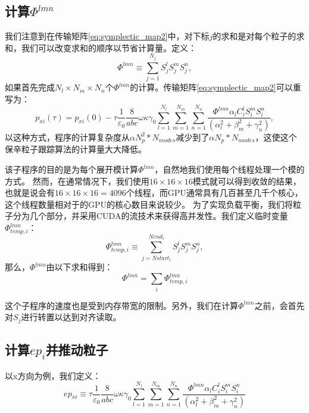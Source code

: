 \subsection{计算$\Phi^{lmn}$}\label{section:phi}
我们注意到在传输矩阵\ref{eq:symplectic_map2}中，对下标$j$的求和是对每个粒子的求和，我们可以改变求和的顺序以节省计算量。定义：
\begin{equation}
\Phi^{lmn}\equiv \sum\limits_{j=1}^{{{N}_{j}}}{S_{j}^{l}S_{j}^{m}S_{j}^{n}},
\end{equation}
如果首先完成${{N}_{l}}\times{{N}_{m}}\times{{N}_{n}}$个$\Phi^{lmn}$的计算。传输矩阵\ref{eq:symplectic_map2}可以重写为：
\begin{equation}\label{eq:symplectic_map3}
{{p}_{xi}}(\tau )={{p}_{xi}}(0)-\tau \frac{1}{{{\varepsilon }_{0}}}\frac{8}{abc}\omega \kappa {{\gamma }_{0}}\sum\limits_{l=1}^{{{N}_{l}}}{\sum\limits_{m=1}^{{{N}_{m}}}{\sum\limits_{n=1}^{{{N}_{n}}}{\frac{\Phi^{lmn}{{\alpha }_{l}}C_{i}^{l}S_{i}^{m}S_{i}^{n}}{(\alpha _{l}^{2}+\beta _{m}^{2}+\gamma _{n}^{2})}}}},
\end{equation}
以这种方式，程序的计算复杂度从$\alpha N_p^2*N_{modes}$减少到了$\alpha  N_p*N_{modes}$，这使这个保辛粒子跟踪算法的计算量大大降低。

该子程序的目的是为每个展开模计算$\Phi^{lmn}$，自然地我们使用每个线程处理一个模的方式。
然而，在通常情况下，我们使用$16\times 16\times 16$模式就可以得到收敛的结果，也就是说会有$16\times 16\times 16 = 4096$个线程，而GPU通常具有几百甚至几千个核心，这个线程数量相对于的GPU的核心数目来说较少。
为了实现负载平衡，我们将粒子分为几个部分，并采用CUDA的流技术来获得高并发性。我们定义临时变量$\Phi^{lmn}_{temp,i}$：
\begin{equation}
\Phi^{lmn}_{temp,i}\equiv \sum\limits_{j=Nstar{{t}_{i}}}^{Nen{{d}_{i}}}{S_{j}^{l}S_{j}^{m}S_{j}^{n}},
\end{equation}
那么，$\Phi^{lmn}$由以下求和得到：
\begin{equation}
\Phi^{lmn}=\sum\limits_{i}{\Phi^{lmn}_{temp,i}}
\end{equation}

这个子程序的速度也是受到内存带宽的限制。另外，我们在计算$\Phi^{lmn}$之前，会首先对$S_{j}$进行转置以达到对齐读取。

\subsection{计算$ep_i$并推动粒子}
以x方向为例，我们定义：
\begin{equation}
ep{_{xi}}\equiv \tau \frac{1}{{{\varepsilon }_{0}}}\frac{8}{abc}\omega \kappa {{\gamma }_{0}}\sum\limits_{l=1}^{{{N}_{l}}}{\sum\limits_{m=1}^{{{N}_{m}}}{\sum\limits_{n=1}^{{{N}_{n}}}{\frac{\Phi^{lmn}{{\alpha }_{l}}C_{i}^{l}S_{i}^{m}S_{i}^{n}}{(\alpha _{l}^{2}+\beta _{m}^{2}+\gamma _{n}^{2})}}}}
\end{equation}

